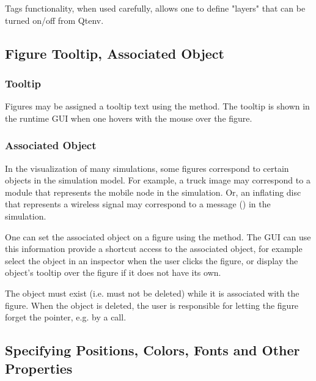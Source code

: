 Tags functionality, when used carefully, allows one to define "layers"
that can be turned on/off from Qtenv.



\subsection{Figure Tooltip, Associated Object}
\label{sec:graphics:figure-tooltip-associated-object}

\subsubsection{ Tooltip}
\label{sec:graphics:figure-tooltip}

Figures may be assigned a tooltip text using the  method.
The tooltip is shown in the runtime GUI when one hovers with the mouse over the
figure.

\subsubsection{Associated Object}
\label{sec:graphics:figure-associated-object}

In the visualization of many simulations, some figures correspond to
certain objects in the simulation model. For example, a truck image
may correspond to a module that represents the mobile node
in the simulation. Or, an inflating disc that represents a wireless
signal may correspond to a message () in the simulation.

One can set the associated object on a figure using the
 method. The GUI can use this information
provide a shortcut access to the associated object, for example select the
object in an inspector when the user clicks the figure, or display
the object's tooltip over the figure if it does not have its own.

\begin{caution}
The object must exist (i.e. must not be deleted) while it is
associated with the figure. When the object is deleted, the user
is responsible for letting  the figure forget the pointer,
e.g. by a   call.
\end{caution}


\subsection{Specifying Positions, Colors, Fonts and Other Properties}
\label{sec:graphics:figure-positions-colors-fonts-etc}

